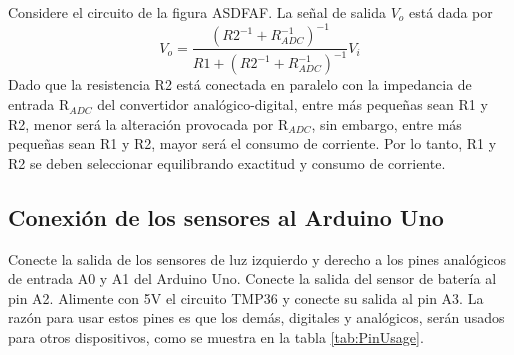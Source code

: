 \documentclass[a4paper,12pt]{article}
\newcommand\ddfrac[2]{\frac{\displaystyle #1}{\displaystyle #2}}
\begin{document}
Considere el circuito de la figura ASDFAF. La señal de salida $V_o$ está dada por
\[V_o = \ddfrac{\left(R2^{-1} + R_{ADC}^{-1}\right)^{-1}}{R1 + \left(R2^{-1} + R_{ADC}^{-1}\right)^{-1}}V_i\]
Dado que la resistencia R2 está conectada en paralelo con la impedancia de entrada $\textrm{R}_{ADC}$ del convertidor analógico-digital, entre más pequeñas sean R1 y R2, menor será la alteración provocada por $\textrm{R}_{ADC}$, sin embargo, entre más pequeñas sean R1 y R2, mayor será el consumo de corriente. Por lo tanto, R1 y R2 se deben seleccionar equilibrando exactitud y consumo de corriente. 

\subsection{Conexión de los sensores al Arduino Uno}
Conecte la salida de los sensores de luz izquierdo y derecho a los pines analógicos de entrada A0 y A1 del Arduino Uno.  Conecte la salida del sensor de batería al pin A2. Alimente con 5V el circuito TMP36 y conecte su salida al pin A3. La razón para usar estos pines es que los demás, digitales y analógicos, serán usados para otros dispositivos, como se muestra en la tabla \ref{tab:PinUsage}.
\end{document}
